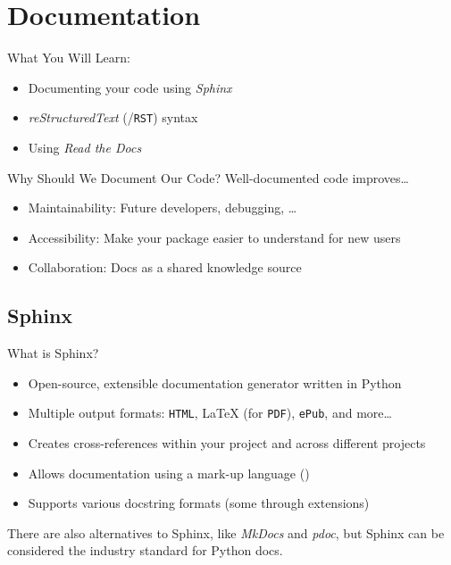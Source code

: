 \section{Documentation}


\begin{frame}[fragile]{What You Will Learn:}
  \begin{itemize}
    \item Documenting your code using \emph{Sphinx}
    \item \emph{reStructuredText} (\reST/\texttt{RST}) syntax
    \item Using \emph{Read the Docs}
  \end{itemize}
\end{frame}


\begin{frame}[fragile]{Why Should We Document Our Code?}
  Well-documented code improves\dots
  \begin{itemize}
    \item Maintainability: Future developers, debugging, \dots
    \item Accessibility: Make your package easier to understand for new users
    \item Collaboration: Docs as a shared knowledge source
  \end{itemize}
\end{frame}

\subsection{Sphinx}
\begin{frame}[fragile]{
  What is Sphinx?
  \hfill
  }
  \begin{itemize}
    \setlength{\itemsep}{1em}
    \item Open-source, extensible documentation generator written in Python
    \item Multiple output formats: \texttt{HTML}, \LaTeX{} (for \texttt{PDF}), \texttt{ePub}, and more\dots
    \item Creates cross-references within your project and across different projects
    \item Allows documentation using a mark-up language (\reST)
    \item Supports various docstring formats (some through extensions)
  \end{itemize}

  \vspace{1cm}
  There are also alternatives to Sphinx, like \emph{MkDocs} and \emph{pdoc}, but Sphinx can be considered the industry standard for Python docs.
\end{frame}


